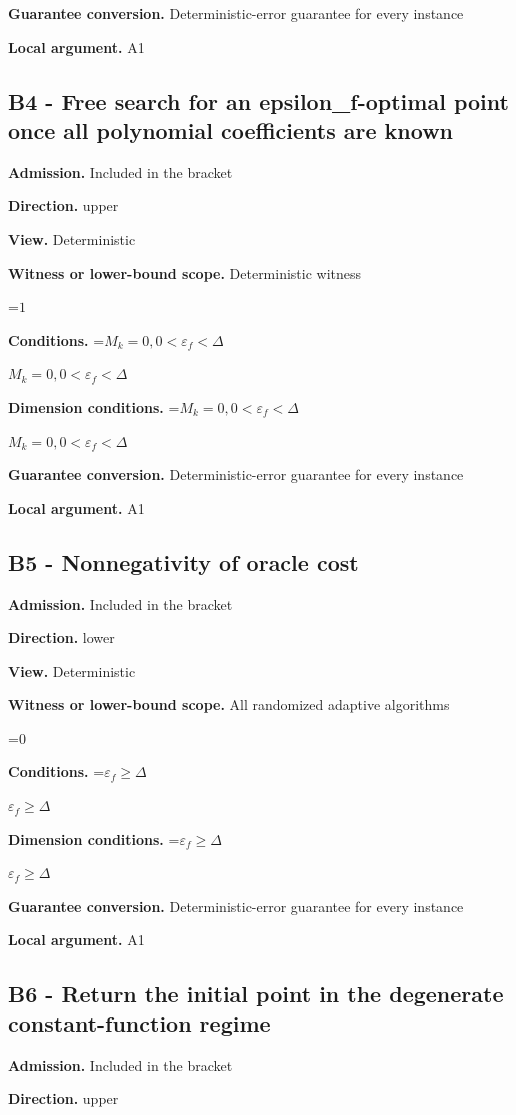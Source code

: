 \documentclass[10pt,a4paper]{article}
\newcommand{\AtlasMath}[1]{\par\begingroup\centering\setbox0=\hbox{$\displaystyle #1$}\ifdim\wd0>1.4\linewidth\typeout{ATLAS WIDE FORMULA: \the\wd0}\fi\ifdim\wd0>\linewidth\resizebox{\linewidth}{!}{\box0}\else\box0\fi\par\endgroup}
\newcommand{\AtlasInlineMath}[1]{\begingroup\setbox0=\hbox{$#1$}\ifdim\wd0>.4\linewidth\endgroup\AtlasMath{#1}\else\endgroup$#1$\fi}
\begin{document}
\textbf{Guarantee conversion.} Deterministic-error guarantee for every instance

\textbf{Local argument.} A1

\subsection{B4 - Free search for an epsilon\_f-optimal point once all polynomial coefficients are known}
\textbf{Admission.} Included in the bracket

\textbf{Direction.} upper

\textbf{View.} Deterministic

\textbf{Witness or lower-bound scope.} Deterministic witness

\AtlasMath{1}
\textbf{Conditions.} \AtlasInlineMath{M_k=0,0<\varepsilon_f<\Delta}

\textbf{Dimension conditions.} \AtlasInlineMath{M_k=0,0<\varepsilon_f<\Delta}

\textbf{Guarantee conversion.} Deterministic-error guarantee for every instance

\textbf{Local argument.} A1

\subsection{B5 - Nonnegativity of oracle cost}
\textbf{Admission.} Included in the bracket

\textbf{Direction.} lower

\textbf{View.} Deterministic

\textbf{Witness or lower-bound scope.} All randomized adaptive algorithms

\AtlasMath{0}
\textbf{Conditions.} \AtlasInlineMath{\varepsilon_f\ge \Delta}

\textbf{Dimension conditions.} \AtlasInlineMath{\varepsilon_f\ge \Delta}

\textbf{Guarantee conversion.} Deterministic-error guarantee for every instance

\textbf{Local argument.} A1

\subsection{B6 - Return the initial point in the degenerate constant-function regime}
\textbf{Admission.} Included in the bracket

\textbf{Direction.} upper
\end{document}
